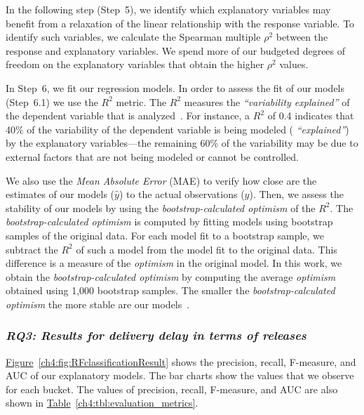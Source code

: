 In the following step (Step~5), we identify which explanatory variables may
benefit from a relaxation of the linear relationship with the response variable.
To identify such variables, we calculate the Spearman multiple $\rho^2$ between
the response and explanatory variables. We spend more of our budgeted degrees of
freedom on the explanatory variables that obtain the higher $\rho^2$ values.

In Step~6, we fit our regression models. In order to assess the fit of our
models (Step~6.1) we use the $R^2$ metric. The $R^2$ measures the {\em
``variability explained''} of the dependent variable that is
analyzed~\cite{steel1960principles}. For instance, a $R^2$ of 0.4 indicates that
40\% of the variability of the dependent variable is being modeled ({\em
``explained''}) by the explanatory variables---the remaining 60\% of the
variability may be due to external factors that are not being modeled or cannot
be controlled. 

We also use the \textit{Mean Absolute Error} (MAE) to verify how close are the
estimates of our models ($\hat{y}$) to the actual observations ($y$). Then, we
assess the stability of our models by using the \textit{bootstrap-calculated
optimism} of the $R^2$. The \textit{bootstrap-calculated optimism} is computed
by fitting models using bootstrap samples of the original data. For each model
fit to a bootstrap sample, we subtract the $R^2$ of such a model from the model
fit to the original data. This difference is a measure of the \textit{optimism}
in the original model. In this work, we obtain the \textit{bootstrap-calculated
optimism} by computing the average \textit{optimism} obtained using 1,000
bootstrap samples. The smaller the \textit{bootstrap-calculated optimism} the
more stable are our models~\cite{efron1986biased}.

\subsubsection*{\textit{\textbf{RQ3: Results for delivery delay in terms of
releases}}}

\noindent{}
\hyperref[ch4:fig:RFclassificationResult]{Figure}~\ref{ch4:fig:RFclassificationResult}
shows the precision, recall, F-measure, and AUC of our explanatory models.  The
bar charts show the values that we observe for each bucket. The values of
precision, recall, F-measure, and AUC are also shown in
\hyperref[ch4:tbl:evaluation_metrics]{Table}~\ref{ch4:tbl:evaluation_metrics}. 

